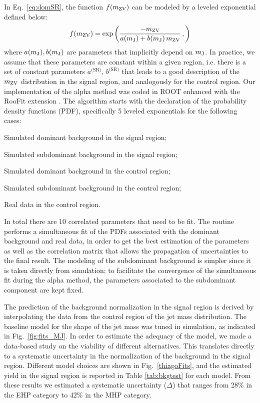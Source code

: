 In Eq.~\ref{eq:domSR}, the function $f(m_\mathrm{ZV})$ can be modeled by a leveled exponential defined below:
\begin{equation}
f(m_\mathrm{ZV}) = \exp \left (
\frac{-m_\mathrm{ZV}}
{a(m_\mathrm{J}) + b(m_\mathrm{J})\,m_\mathrm{ZV}}\,,
\right )
\end{equation}
where $a(m_\mathrm{J}), b(m_\mathrm{J})$ are parameters that implicitly depend on $m_\mathrm{J}$. In practice, we assume that these parameters are constant within a given region, i.e. there is a set of constant parameters $a^{\textrm{(SR)}}$, $b^{\textrm{(SR)}}$ that leads to a good description of the $m_\mathrm{ZV}$ distribution in the signal region, and analogously for the control region. Our implementation of the alpha method was coded in ROOT \cite{Antcheva:2011zz} enhanced with the RooFit extension \cite{Verkerke:2003ir}. The algorithm starts with the declaration of the probability density functions (PDF), specifically 5 leveled exponentials for the following cases:
\begin{compact_itemize}
\item Simulated dominant background in the signal region;
\item Simulated subdominant background in the signal region;
\item Simulated dominant background in the control region;
\item Simulated subdominant background in the control region;
\item Real data in the control region.
\end{compact_itemize}
In total there are 10 correlated parameters that need to be fit. The routine performs a simultaneous fit of the PDFs associated with the dominant background and real data, in order to get the best estimation of the parameters as well as the correlation matrix that allows the propagation of uncertainties to the final result. The modeling of the subdominant background is simpler since it is taken directly from simulation; to facilitate the convergence of the simultaneous fit during the alpha method, the parameters associated to the subdominant component are kept fixed.

The prediction of the background normalization in the signal region is derived by interpolating the data from the control region of the jet mass distribution. The baseline model for the shape of the jet mass was tuned in simulation, as indicated in Fig.~\ref{fig:fits_MJ}. In order to estimate the adequacy of the model, we made a data-based study on the viability of different alternatives. This translates directly to a systematic uncertainty in the normalization of the background in the signal region. Different model choices are shown in Fig.~\ref{thiagoFits}, and the estimated yield in the signal region is reported in Table \ref{tab:bkgtest} for each model. From these results we estimated a systematic uncertainty ($\Delta$) that ranges from 28\% in the EHP category to 42\% in the MHP category.

